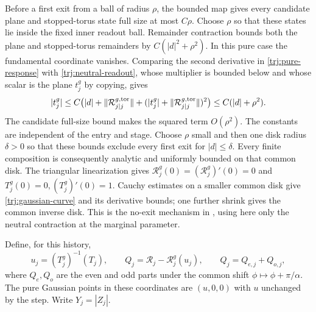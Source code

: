 Before a first exit from a ball of radius \(\rho\), the bounded map
gives every candidate plane and stopped-torus state full size at most
\(C\rho\).  Choose \(\rho\) so that these states lie inside the fixed
inner readout ball.  Remainder contraction bounds both the plane and
stopped-torus remainders
by \(C(|d|^2+\rho^2)\).  In this pure case the fundamental coordinate
vanishes.  Comparing the second derivative in
\eqref{trj:pure-response} with \eqref{trj:neutral-readout}, whose
multiplier is bounded below and whose scalar is the plane \(t_j^g\)
by copying, gives
\[
 |t_j^g|\le C\bigl(|d|+\|\mathcal R^{g,\rm tor}_{j|j}\|
                +( |t_j^g|+\|\mathcal R^{g,\rm tor}_{j|j}\|)^2\bigr)
       \le C(|d|+\rho^2).
\]
The candidate full-size bound makes the squared term \(O(\rho^2)\).
The constants are independent of the entry and stage.  Choose
\(\rho\) small and then one disk radius
\(\delta>0\) so that these bounds exclude every first exit for
\(|d|\le\delta\).  Every finite composition is consequently analytic
and uniformly bounded on that common disk.  The triangular
linearization gives
\(\mathcal R_j^g(0)=(\mathcal R_j^g)'(0)=0\) and
\(T_j^g(0)=0,(T_j^g)'(0)=1\).  Cauchy estimates on a smaller common
disk give \eqref{trj:gaussian-curve} and its derivative bounds;
one further shrink gives the common inverse disk.  This is the
no-exit mechanism in \cite[Section~5.4, proof of Proposition~5.1]{C},
using here only the neutral contraction at the marginal parameter.

Define, for this history,
\begin{equation}\label{trj:normal-coordinates}
 u_j=(T_j^g)^{-1}(T_j),\qquad
 Q_j=\mathcal R_j-\mathcal R_j^g(u_j),\qquad
 Q_j=Q_{e,j}+Q_{o,j},
\end{equation}
where \(Q_e,Q_o\) are the even and odd parts under the common shift
\(\phi\mapsto\phi+\pi/\alpha\).  The pure Gaussian points in these
coordinates are \((u,0,0)\) with \(u\) unchanged by the step.  Write
\(Y_j=|Z_j|\).


